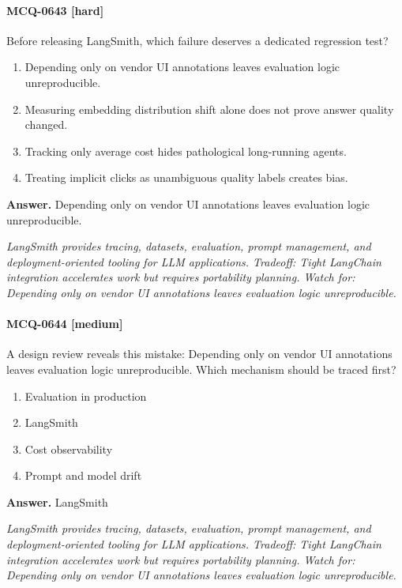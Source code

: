 \paragraph{MCQ-0643 [hard]} Before releasing LangSmith, which failure deserves a dedicated regression test?
\begin{enumerate}[label=\Alph*.]
\item Depending only on vendor UI annotations leaves evaluation logic unreproducible.
\item Measuring embedding distribution shift alone does not prove answer quality changed.
\item Tracking only average cost hides pathological long-running agents.
\item Treating implicit clicks as unambiguous quality labels creates bias.
\end{enumerate}
\noindent\textbf{Answer.} Depending only on vendor UI annotations leaves evaluation logic unreproducible.
\par\textit{LangSmith provides tracing, datasets, evaluation, prompt management, and deployment-oriented tooling for LLM applications. Tradeoff: Tight LangChain integration accelerates work but requires portability planning. Watch for: Depending only on vendor UI annotations leaves evaluation logic unreproducible.}
\paragraph{MCQ-0644 [medium]} A design review reveals this mistake: Depending only on vendor UI annotations leaves evaluation logic unreproducible. Which mechanism should be traced first?
\begin{enumerate}[label=\Alph*.]
\item Evaluation in production
\item LangSmith
\item Cost observability
\item Prompt and model drift
\end{enumerate}
\noindent\textbf{Answer.} LangSmith
\par\textit{LangSmith provides tracing, datasets, evaluation, prompt management, and deployment-oriented tooling for LLM applications. Tradeoff: Tight LangChain integration accelerates work but requires portability planning. Watch for: Depending only on vendor UI annotations leaves evaluation logic unreproducible.}
